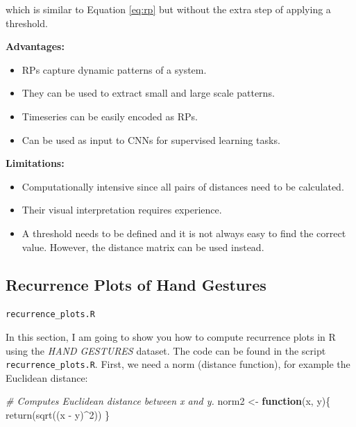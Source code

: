 \documentclass[
  11pt,
]{krantz}
\makeatletter
\newenvironment{Shaded}{\begin{snugshade}}{\end{snugshade}}
\newcommand{\CommentTok}[1]{\textcolor[rgb]{0.37,0.37,0.37}{\textit{#1}}}
\newcommand{\ControlFlowTok}[1]{\textcolor[rgb]{0.27,0.27,0.27}{\textbf{#1}}}
\newcommand{\DecValTok}[1]{\textcolor[rgb]{0.06,0.06,0.06}{#1}}
\newcommand{\FunctionTok}[1]{\textcolor[rgb]{0,0,0}{#1}}
\newcommand{\NormalTok}[1]{#1}
\newcommand{\OtherTok}[1]{\textcolor[rgb]{0.37,0.37,0.37}{#1}}
\newcommand{\SpecialCharTok}[1]{\textcolor[rgb]{0,0,0}{#1}}
\providecommand{\tightlist}{%
  \setlength{\itemsep}{0pt}\setlength{\parskip}{0pt}}
\newenvironment{kframe}{%
\medskip{}
\setlength{\fboxsep}{.8em}
 \def\at@end@of@kframe{}%
 \ifinner\ifhmode%
  \def\at@end@of@kframe{\end{minipage}}%
  \begin{minipage}{\columnwidth}%
 \fi\fi%
 \def\FrameCommand##1{\hskip\@totalleftmargin \hskip-\fboxsep
 \colorbox{shadecolor}{##1}\hskip-\fboxsep
     \hskip-\linewidth \hskip-\@totalleftmargin \hskip\columnwidth}%
 \MakeFramed {\advance\hsize-\width
   \@totalleftmargin\z@ \linewidth\hsize
   \@setminipage}}%
 {\par\unskip\endMakeFramed%
 \at@end@of@kframe}
\newenvironment{rmdblock}[1]
  {
  \begin{itemize}
  \renewcommand{\labelitemi}{
    \raisebox{-.7\height}[0pt][0pt]{
      {\setkeys{Gin}{width=3em,keepaspectratio}\texttt{[image: images/icons/\#1]}}
    }
  }
  \setlength{\fboxsep}{1em}
  \begin{kframe}
  \item
  }
  {
  \end{kframe}
  \end{itemize}
  }
\newenvironment{rmdfolder}
  {\begin{rmdblock}{folder}}
  {\end{rmdblock}}
\makeatother
\begin{document}
which is similar to Equation \eqref{eq:rp} but without the extra step of applying a threshold.

\textbf{Advantages:}

\begin{itemize}
\tightlist
\item
  RPs capture dynamic patterns of a system.
\item
  They can be used to extract small and large scale patterns.
\item
  Timeseries can be easily encoded as RPs.
\item
  Can be used as input to CNNs for supervised learning tasks.
\end{itemize}

\textbf{Limitations:}

\begin{itemize}
\tightlist
\item
  Computationally intensive since all pairs of distances need to be calculated.
\item
  Their visual interpretation requires experience.
\item
  A threshold needs to be defined and it is not always easy to find the correct value. However, the distance matrix can be used instead.
\end{itemize}

\hypertarget{recurrence-plots-of-hand-gestures}{%
\subsection{Recurrence Plots of Hand Gestures}\label{recurrence-plots-of-hand-gestures}}

\begin{rmdfolder}
\texttt{recurrence\_plots.R}
\end{rmdfolder}

In this section, I am going to show you how to compute recurrence plots in R using the \emph{HAND GESTURES} dataset. The code can be found in the script \texttt{recurrence\_plots.R}. First, we need a norm (distance function), for example the Euclidean distance:

\begin{Shaded}
\begin{Highlighting}[]
\CommentTok{\# Computes Euclidean distance between x and y.}
\NormalTok{norm2 }\OtherTok{\textless{}{-}} \ControlFlowTok{function}\NormalTok{(x, y)\{}
  \FunctionTok{return}\NormalTok{(}\FunctionTok{sqrt}\NormalTok{((x }\SpecialCharTok{{-}}\NormalTok{ y)}\SpecialCharTok{\^{}}\DecValTok{2}\NormalTok{))}
\NormalTok{\}}
\end{Highlighting}
\end{Shaded}
\end{document}
